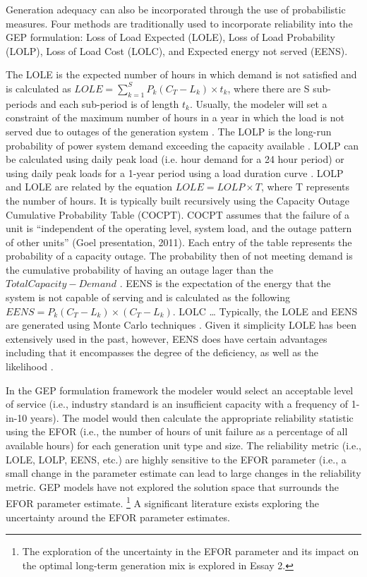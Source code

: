 \documentclass[10pt]{amsart}
\begin{document}
	Generation adequacy can also be incorporated through the use of probabilistic measures. 
	Four methods are traditionally used to incorporate reliability into the GEP formulation: Loss of Load Expected (LOLE), Loss of Load Probability (LOLP), Loss of Load Cost (LOLC), and Expected energy not served (EENS).
	
	The LOLE is the expected number of hours in which demand is not satisfied and is calculated as $LOLE = \sum_{k=1}^S P_k\left(C_T - L_k \right)\times t_k$, where there are S sub-periods and each sub-period is of length $t_k$.
	Usually, the modeler will set a constraint of the maximum number of hours in a year in which the load is not served due to outages of the generation system \parencite{phoon:2006}.
	The LOLP is the long-run probability of power system demand exceeding the capacity available \parencite{endrenyi:1978}.  
	LOLP can be calculated using daily peak load (i.e. hour demand for a 24 hour period) or using daily peak loads for a 1-year period using a load duration curve \parencite{endrenyi:1978}.
	LOLP and LOLE are related by the equation $LOLE = LOLP \times T$, where T represents the number of hours.   
	It is typically built recursively using the Capacity Outage Cumulative Probability Table (COCPT). 
	COCPT assumes that the failure of a unit is ``independent of the operating level, system load, and the outage pattern of other units'' (Goel presentation, 2011). 
	Each entry of the table represents the probability of a capacity outage.
	The probability then of not meeting demand is the cumulative probability of having an outage lager than the $Total Capacity - Demand$ \parencite[p78]{pereira2010decision}.
	EENS is the expectation of the energy that the system is not capable of serving and is calculated as the following $EENS = P_k \left(C_T - L_k \right)\times \left(C_T- L_k \right)$. 
	LOLC \ldots
	Typically, the LOLE and EENS are generated using Monte Carlo techniques \parencite{billinton1996reliability, li2012uncertainty}.
	Given it simplicity LOLE has been extensively used in the past, however, EENS does have certain advantages including that it encompasses the degree of the deficiency, as well as the likelihood \parencite[p622]{murugan2009nsga}. 
	
	In the GEP formulation framework the modeler would select an acceptable level of service (i.e., industry standard is an insufficient capacity with a frequency of 1-in-10 years)\parencite{}. 
	The model would then calculate the appropriate reliability statistic using the EFOR (i.e., the number of hours of unit failure as a percentage of all available hours) for each generation unit type and size.
	The reliability metric (i.e., LOLE, LOLP, EENS, etc.) are highly sensitive to the EFOR parameter (i.e., a small change in the parameter estimate can lead to large changes in the reliability metric. 
	GEP models have not explored the solution space that surrounds the EFOR parameter estimate. \footnote{The exploration of the uncertainty in the EFOR parameter and its impact on the optimal long-term generation mix is explored in Essay 2.}
	A significant literature exists exploring the uncertainty around the EFOR parameter estimates.
	
\end{document}
